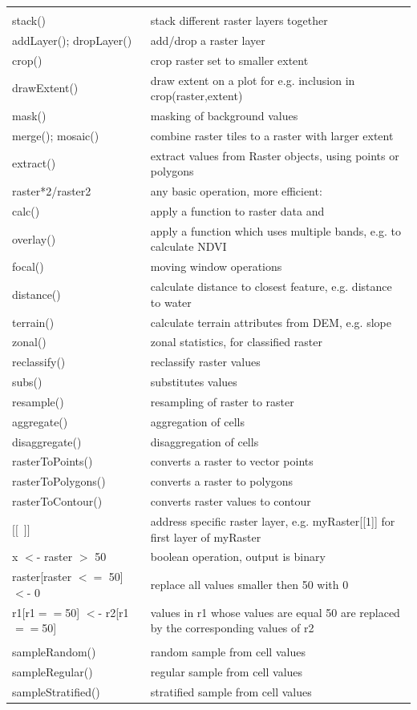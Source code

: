 \documentclass[10pt,landscape]{article}
\begin{document}
\begin{multicols}{3}
\begin{tabular}{@{}p{\the\MyLen}%
                @{}p{\linewidth-\the\MyLen}@{}}
 &  \\                
stack() & stack different raster layers together \\
addLayer(); dropLayer()	& add/drop a raster layer\\
crop() 		& crop raster set to smaller extent  \\
drawExtent()	& draw extent on a plot for e.g. inclusion in crop(raster,extent)\\
mask() 		& masking of background values \\
merge(); mosaic() & combine raster tiles to a raster with larger extent \\
extract() 	& extract values from Raster objects, using points or polygons  \\
raster*2/raster2 & any basic operation, more efficient: \\                
calc()  	& apply a function to raster data and\\
overlay()       & apply a function which uses multiple bands, e.g. to calculate NDVI \\
focal()         & moving window operations \\
distance()      & calculate distance to closest feature, e.g. distance to water\\
terrain() 	& calculate terrain attributes from DEM, e.g. slope \\
zonal()         & zonal statistics, for classified raster\\
reclassify()	& reclassify raster values \\
subs()		& substitutes values \\
resample() 	& resampling of raster to raster \\
aggregate()	& aggregation of cells \\
disaggregate()	& disaggregation of cells \\
rasterToPoints() & converts a raster to vector points	\\
rasterToPolygons() & converts a raster to polygons \\
rasterToContour()  & converts raster values to contour \\
$[[$\ $]]$		& address specific raster layer, e.g. myRaster[[1]] for first layer of myRaster    \\  
x $<$- raster $>$ 50	& boolean operation, output is binary \\
raster[raster $<=$ 50] $<$- 0 & replace all values smaller then 50 with 0 \\
r1[r1$==$50] $<$- r2[r1$==$50] & values in r1 whose values are equal 50 are replaced by the corresponding values of r2 \\
		&			 \\
  sampleRandom() & random sample from cell values\\
  sampleRegular() & regular sample from cell values\\
  sampleStratified() & stratified sample from cell values\\
  

\end{tabular}
\end{multicols}
\end{document}
